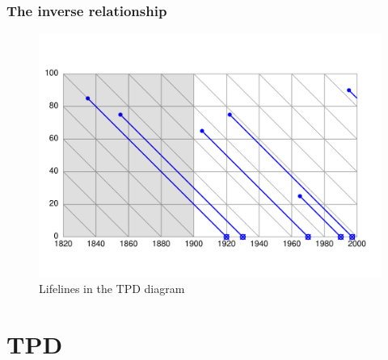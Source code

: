 \documentclass{beamer}
\begin{document}
\begin{frame}
\frametitle{The inverse relationship}
\begin{figure}[b]
    \centering
    \includegraphics[scale=.7]{Figures/LabPres/TPD2.pdf}
    \caption{Lifelines in the TPD diagram}
\end{figure} 
\end{frame}

\section{TPD}
\end{document}
